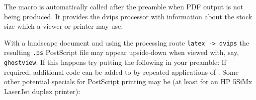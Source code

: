 \documentclass[10pt,letterpaper]{memoir}
\makeatletter
\newcommand{\file}[1]{\texttt{#1}}
\def\cmd#1{\cs{\expandafter\cmd@to@cs\string#1}}
\def\cmd@to@cs#1#2{\char\number`#2\relax}
\DeclareRobustCommand{\cs}[1]{\texttt{\char`\\#1}}
\newcommand*{\cmdprint}[1]{\texttt{\string#1}}
\def\cmd#1{\cmdprint{#1}%
  \index{\expandafter\@gobble\string#1?\string\cmdprint{\string#1}}}
\newcommand{\@zeroseps}{\setlength{\topsep}{\z@}
                        \setlength{\partopsep}{\z@}
                        \setlength{\parskip}{\z@}}
\newlength{\gparindent} \setlength{\gparindent}{\parindent}
\newenvironment{lcode}{\@zeroseps
  \renewcommand{\verbatim@startline}{\verbatim@line{\hskip\gparindent}}
  \small\setlength{\baselineskip}{\onelineskip}\verbatim}%
  {\endverbatim
   \vspace{-\baselineskip}%
   \noindent
}
\newenvironment{syntax}{\begin{center}
                        \begin{tabular}{|p{0.9\linewidth}|} \hline}%
                       {\hline
                        \end{tabular}
                        \end{center}}
\makeatother
\begin{document}
\begin{syntax}
\cmd{\fixdvipslayout} \\
\end{syntax}
The macro \cmd{\fixdvipslayout} is automatically called after the preamble
when PDF output is not being produced. It provides the dvips processor
with information about the stock size which a viewer or printer may use.

    With a landscape document and using the processing route
\texttt{latex -> dvips} the resulting \file{.ps} PostScript file may appear
upside-down when viewed with, say, \texttt{ghostview}. If this happens
try putting the following in your preamble:
\begin{lcode}
\end{lcode}
If required, additional code can be added to \cmd{\fixdvipslayout}
by repeated applications of \cmd{\addtodef}.
Some other potential specials for PostScript printing may be (at least
for an HP 5SiMx LaserJet duplex printer):
\end{document}
